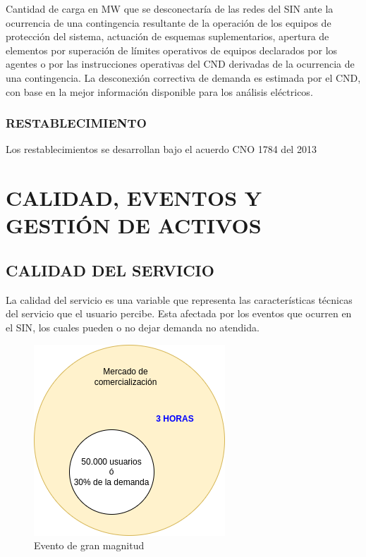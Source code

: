 \documentclass[a5paper]{book}%
\begin{document}
Cantidad de carga en MW que se desconectaría de las redes del SIN ante la ocurrencia de una contingencia resultante de la operación de los equipos de protección del sistema, actuación de esquemas suplementarios, apertura de elementos por superación de límites operativos de equipos declarados por los agentes o por las instrucciones operativas del CND derivadas de la ocurrencia de una contingencia. La desconexión correctiva de demanda es estimada por el CND, con base en la mejor información disponible para los análisis eléctricos.

\section{RESTABLECIMIENTO}

Los restablecimientos se desarrollan bajo el acuerdo CNO 1784 del 2013

\part{CALIDAD, EVENTOS Y GESTIÓN DE ACTIVOS}

\chapter{CALIDAD DEL SERVICIO}

La calidad del servicio  es una variable que representa las características técnicas del servicio que el usuario percibe. Esta afectada por los eventos que ocurren en
el \ac{SIN}, los cuales pueden o no dejar demanda no atendida.

\begin{figure}[H]
  \centering
  \caption{Evento de gran magnitud}
  \label{fig:eventogranmagnitud}
  \includegraphics[width=0.6\linewidth]{evento_gran_magnitud}
\end{figure}
\end{document}
